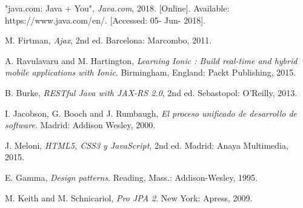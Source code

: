 \begin{thebibliography}{9}

\thispagestyle{numberingStyle}
\pagestyle{numberingStyle}

"java.com: Java + You", \textit{Java.com}, 2018. [Online]. Available: https://www.java.com/en/. [Accessed: 05- Jun- 2018].

M. Firtman, \textit{Ajax}, 2nd ed. Barcelona: Marcombo, 2011.

A. Ravulavaru and M. Hartington, \textit{Learning Ionic : Build real-time and hybrid mobile applications with Ionic}. Birmingham, England: Packt Publishing, 2015.

B. Burke, \textit{RESTful Java with JAX-RS 2.0}, 2nd ed. Sebastopol: O'Reilly, 2013.

I. Jacobson, G. Booch and J. Rumbaugh, \textit{El proceso unificado de desarrollo de software}. Madrid: Addison Wesley, 2000.

J. Meloni, \textit{HTML5, CSS3 y JavaScript}, 2nd ed. Madrid: Anaya Multimedia, 2015.

E. Gamma, \textit{Design patterns}. Reading, Mass.: Addison-Wesley, 1995.

M. Keith and M. Schnicariol, \textit{Pro JPA 2}. New York: Apress, 2009.

\end{thebibliography}

